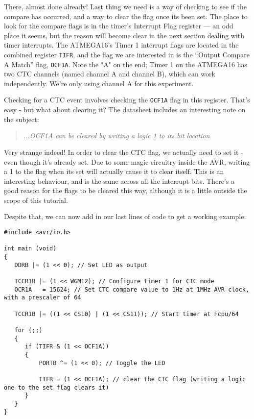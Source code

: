 \documentclass[a4paper,oneside,notitlepage]{book}
\begin{document}
There, almost done already! Last thing we need is a way of checking to see if the compare has occurred, and a way to clear the flag once its been set. The place to look for the compare flags is in the timer's Interrupt Flag register --- an odd place it seems, but the reason will become clear in the next section dealing with timer interrupts. The ATMEGA16's Timer 1 interrupt flags are located in the combined register \texttt{TIFR}, and the flag we are interested in is the ``Output Compare A Match'' flag, \texttt{OCF1A}. Note the "A" on the end; Timer 1 on the ATMEGA16 has two CTC channels (named channel A and channel B), which can work independently. We're only using channel A for this experiment.

Checking for a CTC event involves checking the \texttt{OCF1A} flag in this register. That's easy - but what about clearing it? The datasheet includes an interesting note on the subject:

\begin{quote}
\emph{...OCF1A can be cleared by writing a logic 1 to its bit location}
\end{quote}

Very strange indeed! In order to clear the CTC flag, we actually need to set it - even though it's already set. Due to some magic circuitry inside the AVR, writing a 1 to the flag when its set will actually cause it to clear itself. This is an interesting behaviour, and is the same across all the interrupt bits. There's a good reason for the flags to be cleared this way, although it is a little outside the scope of this tutorial.

Despite that, we can now add in our last lines of code to get a working example:

\begin{center}
\begin{lstlisting}
#include <avr/io.h>

int main (void)
{
   DDRB |= (1 << 0); // Set LED as output

   TCCR1B |= (1 << WGM12); // Configure timer 1 for CTC mode
   OCR1A   = 15624; // Set CTC compare value to 1Hz at 1MHz AVR clock, with a prescaler of 64

   TCCR1B |= ((1 << CS10) | (1 << CS11)); // Start timer at Fcpu/64

   for (;;)
   {
      if (TIFR & (1 << OCF1A))
      {
          PORTB ^= (1 << 0); // Toggle the LED

          TIFR = (1 << OCF1A); // clear the CTC flag (writing a logic one to the set flag clears it)
      }
   }
}
\end{lstlisting}
\end{center}
\end{document}
